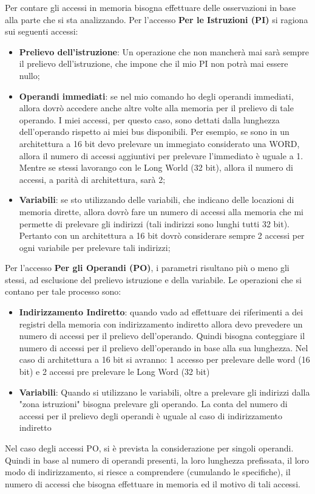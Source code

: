 Per contare gli accessi in memoria bisogna effettuare delle osservazioni in base alla parte che si sta analizzando.
Per l'accesso \textbf{Per le Istruzioni (PI)} si ragiona sui seguenti accessi:
\begin{itemize}
    \item \textbf{Prelievo dell'istruzione}: Un operazione che non mancherà mai sarà sempre il prelievo dell'istruzione, che impone che il mio PI non potrà mai essere nullo;
    \item \textbf{Operandi immediati}: se nel mio comando ho degli operandi immediati, allora dovrò accedere anche altre volte alla memoria per il prelievo di tale operando. I miei accessi, per questo caso, sono dettati dalla lunghezza dell'operando rispetto ai miei bus disponibili. Per esempio, se sono in un architettura a 16 bit devo prelevare un immegiato considerato una WORD, allora il numero di accessi aggiuntivi per prelevare l'immediato è uguale a 1. Mentre se stessi lavorango con le Long World (32 bit), allora il numero di accessi, a parità di architettura, sarà 2;
    \item \textbf{Variabili}: se sto utilizzando delle variabili, che indicano delle locazioni di memoria dirette, allora dovrò fare un numero di accessi alla memoria che mi permette di prelevare gli indirizzi (tali indirizzi sono lunghi tutti 32 bit). Pertanto con un architettura a 16 bit dovrò considerare sempre 2 accessi per ogni variabile per prelevare tali indirizzi;
\end{itemize}

Per l'accesso \textbf{Per gli Operandi (PO)}, i parametri risultano più o meno gli stessi, ad esclusione del prelievo istruzione e della variabile. Le operazioni che si contano per tale processo sono:
\begin{itemize}
    \item \textbf{Indirizzamento Indiretto}: quando vado ad effettuare dei riferimenti a dei registri della memoria con indirizzamento indiretto allora devo prevedere un numero di accessi per il prelievo dell'operando. Quindi bisogna conteggiare il numero di accessi per il prelievo dell'operando in base alla sua lunghezza. Nel caso di architettura a 16 bit si avranno: 1 accesso per prelevare delle word (16 bit) e 2 accessi pre prelevare le Long Word (32 bit)

    \item \textbf{Variabili}: Quando si utilizzano le variabili, oltre a prelevare gli indirizzi dalla "zona istruzioni" bisogna prelevare gli operando. La conta del numero di accessi per il prelievo degli operandi è uguale al caso di indirizzamento indiretto
\end{itemize}

Nel caso degli accessi PO, si è prevista la considerazione per singoli operandi. Quindi in base al numero di operandi presenti, la loro lunghezza prefissata, il loro modo di indirizzamento, si riesce a comprendere (cumulando le specifiche), il numero di accessi che bisogna effettuare in memoria ed il motivo di tali accessi.
